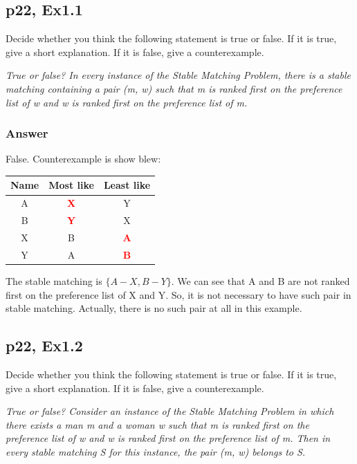 \documentclass[a4paper]{article}
\begin{document}
\subsection*{p22, Ex1.1}
\begin{adjustwidth}{1cm}{1cm}
	Decide whether you think the following statement is true or false. If it is true, give a short explanation. If it is false, give a counterexample.
\end{adjustwidth}
\begin{adjustwidth}{2cm}{1cm}
	\emph{True or false? In every instance of the Stable Matching Problem, there is a stable matching containing a pair (m, w) such that m is ranked first on the preference list of w and w is ranked first on the preference list of m.}
\end{adjustwidth}

\subsubsection*{Answer}
False. Counterexample is show blew:
\begin{center}
	\begin{tabular}{|c|c|c|}
		\hline
		Name & Most like                   & Least like                  \\
		\hline
		A    & \textcolor{red}{\textbf{X}} & Y                           \\
		\hline
		B    & \textcolor{red}{\textbf{Y}} & X                           \\
		\hline
		X    & B                           & \textcolor{red}{\textbf{A}} \\
		\hline
		Y    & A                           & \textcolor{red}{\textbf{B}} \\
		\hline
	\end{tabular}
\end{center}
The stable matching is $\{A-X, B-Y\}$. We can see that A and B are not ranked first on the preference list of X and Y. So, it is not necessary to have such pair in stable matching. Actually, there is no such pair at all in this example.
\vspace{2cm}


\subsection*{p22, Ex1.2}
\begin{adjustwidth}{1cm}{1cm}
	Decide whether you think the following statement is true or false. If it is true, give a short explanation. If it is false, give a counterexample.
\end{adjustwidth}
\begin{adjustwidth}{2cm}{1cm}
	\emph{True or false? Consider an instance of the Stable Matching Problem in which there exists a man m and a woman w such that m is ranked first on the preference list of w and w is ranked first on the preference list of m. Then in every stable matching S for this instance, the pair (m, w) belongs to S.}
\end{adjustwidth}
\end{document}
